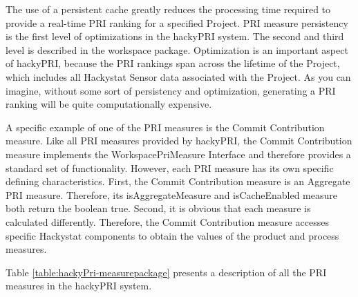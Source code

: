 The use of a persistent cache greatly reduces the processing time required
to provide a real-time PRI ranking for a specified Project.  PRI measure
persistency is the first level of optimizations in the hackyPRI system. The
second and third level is described in the workspace package. Optimization
is an important aspect of hackyPRI, because the PRI rankings span across
the lifetime of the Project, which includes all Hackystat Sensor data
associated with the Project. As you can imagine, without some sort of
persistency and optimization, generating a PRI ranking will be quite
computationally expensive.

A specific example of one of the PRI measures is the Commit Contribution
measure. Like all PRI measures provided by hackyPRI, the Commit
Contribution measure implements the WorkspacePriMeasure Interface and
therefore provides a standard set of functionality. However, each PRI
measure has its own specific defining characteristics. First, the Commit
Contribution measure is an Aggregate PRI measure. Therefore, its
isAggregateMeasure and isCacheEnabled measure both return the boolean true.
Second, it is obvious that each measure is calculated differently.
Therefore, the Commit Contribution measure accesses specific Hackystat
components to obtain the values of the product and process measures.

Table \ref{table:hackyPri-measurepackage} presents a description of all the
PRI measures in the hackyPRI system.

